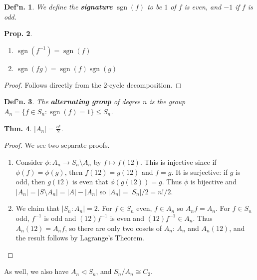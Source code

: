 \documentclass[12pt, a4paper]{book}
\DeclareMathOperator{\sgn}{sgn}
\newtheorem{theorem}{Thm.}[section]
\newtheorem{definition}[theorem]{Def'n.}
\newtheorem{proposition}[theorem]{Prop.}
\theoremstyle{nonumberplain}
\newtheorem{proof}{Proof}
\begin{document}
\begin{definition}
    We define the \textbf{signature} $\sgn(f)$ to be $1$ of $f$ is even, and $-1$ if $f$ is odd.
\end{definition}
\begin{proposition}
    \begin{enumerate}[nolistsep]
        \item $\sgn(f^{-1})=\sgn(f)$
        \item $\sgn(fg)=\sgn(f)\sgn(g)$
    \end{enumerate}
\end{proposition}
\begin{proof}
    Follows directly from the 2-cycle decomposition.
\end{proof}
\begin{definition}
    The \textbf{alternating group} of degree $n$ is the group $A_n=\{f\in S_n:\sgn(f)=1\}\leq S_n$.
\end{definition}
\begin{theorem}
    $|A_n|=\frac{n!}{2}$.
\end{theorem}
\begin{proof}
    We see two separate proofs.
    \begin{enumerate}
        \item Consider $\phi:A_n\to S_n\setminus A_n$ by $f\mapsto f(12)$.
            This is injective since if $\phi(f)=\phi(g)$, then $f(12)=g(12)$ and $f=g$.
            It is surjective: if $g$ is odd, then $g(12)$ is even that $\phi(g(12))=g$.
            Thus $\phi$ is bijective and $|A_n|=|S\setminus A_n|=|A|-|A_n|$ so $|A_n|=|S_n|/2=n!/2$.
        \item We claim that $|S_n:A_n|=2$.
            For $f\in S_n$ even, $f\in A_n$ so $A_nf=A_n$.
            For $f\in S_n$ odd, $f^{-1}$ is odd and $(12)f^{-1}$ is even and $(12)f^{-1}\in A_n$.
            Thus $A_n(12)=A_nf$, so there are only two cosets of $A_n$: $A_n$ and $A_n(12)$, and the result follows by Lagrange's Theorem.
    \end{enumerate}
\end{proof}
As well, we also have $A_n\triangleleft S_n$, and $S_n/A_n\cong C_2$.
\end{document}
